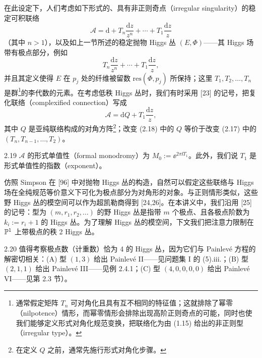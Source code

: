 
在此设定下，人们考虑如下形式的、具有非正则奇点（irregular singularity）的稳定可积联络
\[
\mathcal{A}=\mathrm{d}+T_n\frac{\mathrm{d}z}{z^{n}}+\cdots+T_1\frac{\mathrm{d}z}{z}
\]
（其中 $n>1$），以及如上一节所述的稳定抛物 Higgs 丛 $(E,\Phi)$——其 Higgs 场带有极点部分，例如
\begin{equation}
T_n\frac{\mathrm{d}z}{z^{n}}+\cdots+T_1\frac{\mathrm{d}z}{z}, \tag{2.17}
\end{equation}
并且其定义使得 $E$ 在 $p_j$ 处的纤维被留数 $\mathrm{res}(\Phi,p_j)$ 所保持；这里 $T_1,T_2,\dots,T_n$ 是群\footnote{通常假定矩阵 $T_n$ 可对角化且具有互不相同的特征值；这就排除了幂零（nilpotence）情形，而幂零情形会排除出现高阶正则奇点的可能，同时也使我们能够定义形式对角化规范变换，把联络化为由 (1.15) 给出的非正则型（irregular type）。}的李代数的元素。在考虑低秩 Higgs 丛时，我们有时采用 [23] 的记号，把复化联络（complexified connection）写成
\begin{equation}
\mathcal{A}=\mathrm{d}Q+T_1\frac{\mathrm{d}z}{z}, \tag{2.18}
\end{equation}
其中 $Q$ 是亚纯联络构成的对角方阵\footnote{在定义 $Q$ 之前，通常先施行形式对角化步骤。}；改变 (2.18) 中的 $Q$ 等价于改变 (2.17) 中的 $(T_n,T_{n-1},\dots,T_2)$。

\begin{defn}{2.19} $\mathcal{A}$ 的形式单值性（formal monodromy）为 $M_0:=\ee^{2\pi\ii T_1}$。此外，我们说 $T_1$ 是形式单值性的指数（exponent）。\end{defn}


仿照 Simpson 在 [96] 中对抛物 Higgs 丛的构造，自然可以假定这些联络与 Higgs 场在全纯规范等价意义下可化为极点部分为对角形的对象。与正则情形类似，这些野 Higgs 丛的模空间可以作为超凯勒商得到 [24,26]。在本讲义中，我们沿用 [25] 的记号：型为 $(m,r_1,r_2,\dots)$ 的野 Higgs 丛是指带 $m$ 个极点、且各极点阶数为 $k_i:=r_i+1$ 的 Higgs 丛。为了理解 Higgs 丛的模空间，下文我们把注意力限制在 $\mathbb{P}^{1}$ 上带极点的秩 2 Higgs 丛。

\begin{rem}{2.20} 值得考察极点数（计重数）恰为 4 的 Higgs 丛，因为它们与 Painlevé 方程的解密切相关：(A) 型 $(1,3)$ 给出 Painlevé II——见问题集 I 的 (5).iii.；(B) 型 $(2,1,1)$ 给出 Painlevé III——见例 2.4.1；(C) 型 $(4,0,0,0,0)$ 给出 Painlevé VI——见第 2.3 节）。\end{rem}

